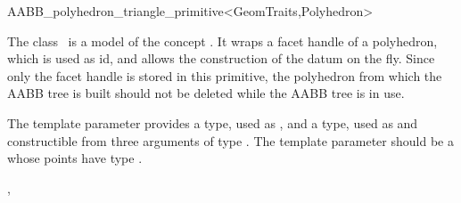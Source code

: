 \ccRefPageBegin


\begin{ccRefClass}{AABB_polyhedron_triangle_primitive<GeomTraits,Polyhedron>}


\ccDefinition
  
The class \ccRefName\ is a model of the concept . It wraps a facet handle of a polyhedron, which is used as id, and allows the construction of the datum on the fly. Since only the facet handle is stored in this primitive, the polyhedron from which the AABB tree is built should not be deleted while the AABB tree is in use.

\ccParameters
The template parameter  provides a  type, used as , and a  type, used as  and constructible from three arguments of type . The template parameter  should be a  whose points have type .


\ccTypes

\ccGlue
{}

\ccSeeAlso

,\\
\\

\end{ccRefClass}

\ccRefPageEnd

